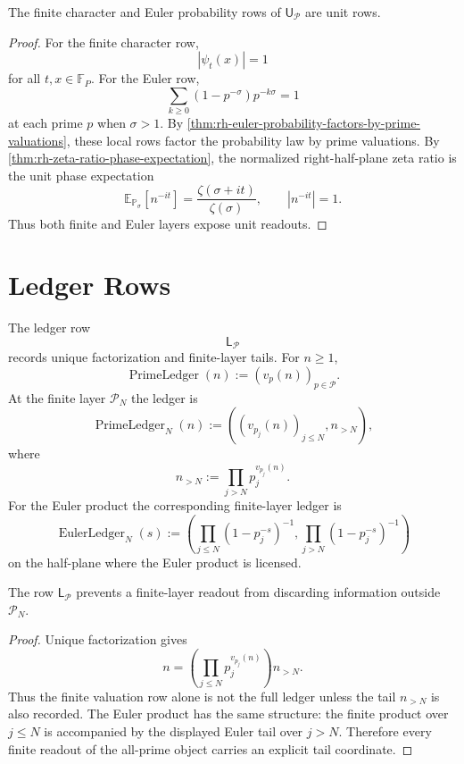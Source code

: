 \begin{theorem}
\label{thm:rh-prime-object-unit-rows-normalized}
The finite character and Euler probability rows of
$\mathsf U_{\mathcal P}$ are unit rows.
\end{theorem}

\begin{proof}
For the finite character row,
$$
|\psi_t(x)|=1
$$
for all $t,x\in\mathbb F_P$.  For the Euler row,
$$
\sum_{k\ge0}(1-p^{-\sigma})p^{-k\sigma}=1
$$
at each prime $p$ when $\sigma>1$.  By
\autoref{thm:rh-euler-probability-factors-by-prime-valuations}, these
local rows factor the probability law by prime valuations.  By
\autoref{thm:rh-zeta-ratio-phase-expectation}, the normalized
right-half-plane zeta ratio is the unit phase expectation
$$
\mathbb E_{\mathbb P_\sigma}[n^{-it}]
=
\frac{\zeta(\sigma+it)}{\zeta(\sigma)},
\qquad
|n^{-it}|=1.
$$
Thus both finite and Euler layers expose unit readouts.
\end{proof}

\section{Ledger Rows}
\label{sec:rh-all-prime-object-ledger-rows}

\begin{definition}
\label{def:rh-prime-object-ledger-row}
The ledger row
$$
\mathsf L_{\mathcal P}
$$
records unique factorization and finite-layer tails.  For $n\ge1$,
$$
\operatorname{PrimeLedger}(n)
:=
(v_p(n))_{p\in\mathcal P}.
$$
At the finite layer $\mathcal P_N$ the ledger is
$$
\operatorname{PrimeLedger}_N(n)
:=
\left(
(v_{p_j}(n))_{j\le N},
n_{>N}
\right),
$$
where
$$
n_{>N}
:=
\prod_{j>N}p_j^{v_{p_j}(n)}.
$$
For the Euler product the corresponding finite-layer ledger is
$$
\operatorname{EulerLedger}_N(s)
:=
\left(
\prod_{j\le N}(1-p_j^{-s})^{-1},
\prod_{j>N}(1-p_j^{-s})^{-1}
\right)
$$
on the half-plane where the Euler product is licensed.
\end{definition}

\begin{theorem}
\label{thm:rh-prime-object-ledger-records-tail-data}
The row $\mathsf L_{\mathcal P}$ prevents a finite-layer readout from
discarding information outside $\mathcal P_N$.
\end{theorem}

\begin{proof}
Unique factorization gives
$$
n=
\left(\prod_{j\le N}p_j^{v_{p_j}(n)}\right)n_{>N}.
$$
Thus the finite valuation row alone is not the full ledger unless the
tail $n_{>N}$ is also recorded.  The Euler product has the same
structure: the finite product over $j\le N$ is accompanied by the
displayed Euler tail over $j>N$.  Therefore every finite readout of the
all-prime object carries an explicit tail coordinate.
\end{proof}

